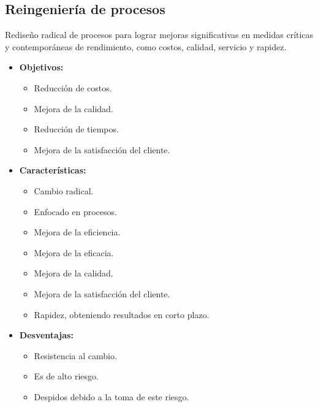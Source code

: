 \documentclass{templateNote}
\begin{document}
\subsection{Reingeniería de procesos}
\noindent Rediseño radical de procesos para lograr mejoras significativas en medidas críticas y contemporáneas de rendimiento, como costos, calidad, servicio y rapidez.
\begin{itemize}
    \item \textbf{Objetivos:}
    \begin{itemize}
        \item Reducción de costos.
        \item Mejora de la calidad.
        \item Reducción de tiempos.
        \item Mejora de la satisfacción del cliente.
    \end{itemize}
    \item \textbf{Características:}
    \begin{itemize}
        \item Cambio radical.
        \item Enfocado en procesos.
        \item Mejora de la eficiencia.
        \item Mejora de la eficacia.
        \item Mejora de la calidad.
        \item Mejora de la satisfacción del cliente.
        \item Rapidez, obteniendo resultados en corto plazo.
    \end{itemize}
    \item \textbf{Desventajas:}
    \begin{itemize}
        \item Resistencia al cambio.
        \item Es de alto riesgo.
        \item Despidos debido a la toma de este riesgo.
    \end{itemize}
\end{itemize}
\end{document}
